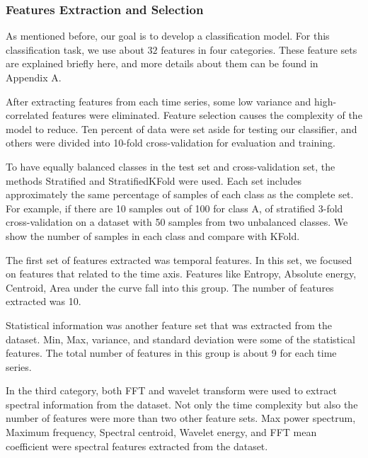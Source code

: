 \subsubsection{Features Extraction and Selection}

As mentioned before, our goal is to develop a classification model. For this classification task, we use about $32$ features in four categories. These feature sets are explained briefly here, and more details about them can be found in Appendix A.

After extracting features from each time series, some low variance and high-correlated features were eliminated. Feature selection causes the complexity of the model to reduce. Ten percent of data were set aside for testing our classifier, and others were divided into 10-fold cross-validation for evaluation and training. 

To have equally balanced classes in the test set and cross-validation set, the methods Stratified and StratifiedKFold were used. Each set includes approximately the same percentage of samples of each class as the complete set. For example, if there are 10 samples out of 100 for class A, of stratified 3-fold cross-validation on a dataset with 50 samples from two unbalanced classes. We show the number of samples in each class and compare with KFold.%


The first set of features extracted was temporal features. In this set, we focused on features that related to the time axis. Features like Entropy, Absolute energy, Centroid, Area under the curve fall into this group. The number of features extracted was 10.

Statistical information was another feature set that was extracted from the dataset. Min, Max, variance, and standard deviation were some of the statistical features. The total number of features in this group is about 9 for each time series.  

In the third category, both FFT and wavelet transform were used to extract spectral information from the dataset. Not only the time complexity but also the number of features were more than two other feature sets. 
Max power spectrum, Maximum frequency, Spectral centroid, Wavelet energy, and FFT mean coefficient were spectral features extracted from the dataset.

